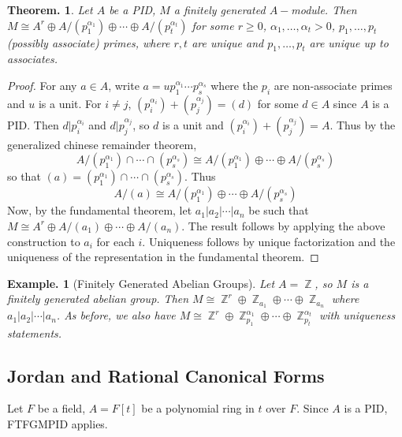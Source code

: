 \documentclass[11pt, a4paper]{memoir}
\DeclareMathOperator{\Z}{{\mathbb{Z}}}
\theoremstyle{change}
\newtheorem{theorem}{Theorem.}[section]
\theoremstyle{plain}
\theoremstyle{nonumberplain}
\newtheorem{example}{Example.}
\newtheorem{proof}{Proof}
\numberwithin{equation}{section}
\begin{document}
\begin{theorem}
    Let $A$ be a PID, $M$ a finitely generated $A-$module.
    Then $M\cong A^r\oplus A/(p_1^{\alpha_1})\oplus\cdots\oplus A/(p_t^{\alpha_t})$ for some $r\geq 0$, $\alpha_1,\ldots,\alpha_t>0$, $p_1,\ldots,p_t$ (possibly associate) primes, where $r,t$ are unique and $p_1,\ldots,p_t$ are unique up to associates.
\end{theorem}
\begin{proof}
    For any $a\in A$, write $a=up_1^{\alpha_1}\cdots p_s^{\alpha_s}$ where the $p_i$ are non-associate primes and $u$ is a unit.
    For $i\neq j$, $(p_i^{\alpha_i})+(p_j^{\alpha_j})=(d)$ for some $d\in A$ since $A$ is a PID.
    Then $d|p_i^{\alpha_i}$ and $d|p_j^{\alpha_j}$, so $d$ is a unit and $(p_i^{\alpha_i})+(p_j^{\alpha_j})=A$.
    Thus by the generalized chinese remainder theorem,
    \begin{equation*}
        A/(p_1^{\alpha_1})\cap\cdots\cap(p_s^{\alpha_s})\cong A/(p_1^{\alpha_1})\oplus \cdots\oplus A/(p_s^{\alpha_s})
    \end{equation*}
    so that $(a)=(p_1^{\alpha_1})\cap\cdots\cap(p_s^{\alpha_s})$.
    Thus
    \begin{equation*}
        A/(a)\cong A/(p_1^{\alpha_1})\oplus \cdots\oplus A/(p_s^{\alpha_s})
    \end{equation*}
    Now, by the fundamental theorem, let $a_1|a_2|\cdots|a_n$ be such that $M\cong A^r\oplus A/(a_1)\oplus\cdots\oplus A/(a_n)$.
    The result follows by applying the above construction to $a_i$ for each $i$.
    Uniqueness follows by unique factorization and the uniqueness of the representation in the fundamental theorem.
\end{proof}
\begin{example}[Finitely Generated Abelian Groups]
    Let $A=\Z$, so $M$ is a finitely generated abelian group.
    Then $M\cong\Z^r\oplus \Z_{a_1}\oplus\cdots\oplus\Z_{a_n}$ where $a_1|a_2|\cdots|a_n$.
    As before, we also have $M\cong\Z^r\oplus\Z_{p_1}^{\alpha_1}\oplus\cdots\oplus\Z_{p_t}^{\alpha_t}$ with uniqueness statements.
\end{example}
\subsection{Jordan and Rational Canonical Forms}
Let $F$ be a field, $A=F[t]$ be a polynomial ring in $t$ over $F$.
Since $A$ is a PID, FTFGMPID applies.
\end{document}
